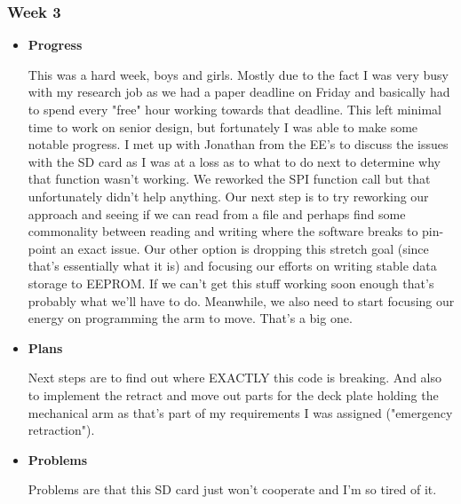 \subsubsection{Week 3}
\begin{itemize}
\item{
	\textbf{Progress}


	This was a hard week, boys and girls. Mostly due to the fact I was very busy with my research job as we had a paper 
	deadline on Friday and basically had to spend every "free" hour working towards that deadline. This left minimal time 
	to work on senior design, but fortunately I was able to make some notable progress. I met up with Jonathan from the 
	EE's to discuss the issues with the SD card as I was at a loss as to what to do next to determine why that function 
	wasn't working. We reworked the SPI function call but that unfortunately didn't help anything. Our next step is to try 
	reworking our approach and seeing if we can read from a file and perhaps find some commonality between reading and 
	writing where the software breaks to pin-point an exact issue. Our other option is dropping this stretch goal (since 
	that's essentially what it is) and focusing our efforts on writing stable data storage to EEPROM. If we can't get this 
	stuff working soon enough that's probably what we'll have to do. Meanwhile, we also need to start focusing our energy 
	on programming the arm to move. That's a big one.
}

\item{
	\textbf{Plans}


	Next steps are to find out where EXACTLY this code is breaking. And also to implement the retract and move out parts for the deck plate holding the mechanical arm as that's part of my requirements I was assigned ("emergency retraction").

}

\item{
	\textbf{Problems}


	Problems are that this SD card just won't cooperate and I'm so tired of it.
}

\end{itemize}


